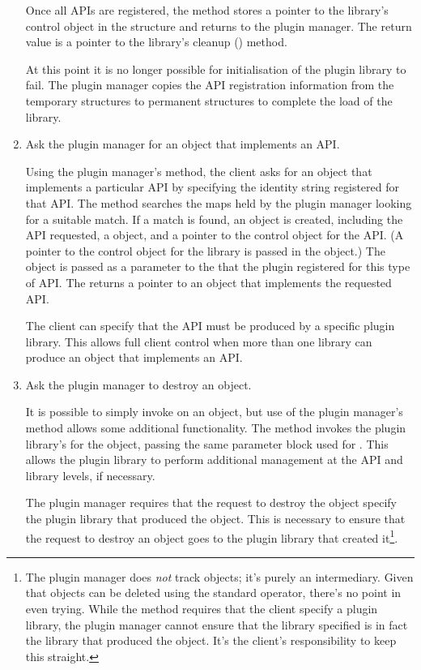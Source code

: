 \documentclass{article}
\begin{document}
\begin{enumerate}
  Once all APIs are registered, the  method stores a pointer
  to the library's control object in the  structure
  and returns to the plugin manager.
  The return value is a pointer to the library's cleanup ()
  method.

  At this point it is no longer possible for initialisation of the plugin
  library to fail.
  The plugin manager copies the API registration information from the
  temporary structures to permanent structures to complete the load of the
  library.

  \item
  Ask the plugin manager for an object that implements an API.

  Using the plugin manager's  method, the client asks for
  an object that implements a particular API by specifying the identity
  string registered for that API\@.
  The  method searches the maps held by the plugin manager
  looking for a suitable match.
  If a match is found, 
  an  object is created, including the API requested, a
   object, and a pointer to the control object for
  the API.
  (A pointer to the control object for the library is passed in the
   object.)
  The  object is passed as a parameter to the
   that the plugin registered for this type of API.
  The  returns a pointer to an object that implements the
  requested API.

  The client can specify that the API must be produced by a specific plugin
  library.
  This allows full client control when more than one library can produce an
  object that implements an API.

  \item
  Ask the plugin manager to destroy an object.

  It is possible to simply invoke  on an object, but use of the
  plugin manager's  method allows some additional
  functionality.
  The  method invokes the plugin library's
   for the object, passing the same 
  parameter block used for .
  This allows the plugin library to perform additional management at the API
  and library levels, if necessary.

  The plugin manager requires that the request to destroy the object specify
  the plugin library that produced the object.
  This is necessary to ensure that the
  request to destroy an object goes to the plugin library that created
  it\footnote{%
  The plugin manager does \textit{not} track objects; it's purely an
  intermediary.
  Given that objects can be deleted using the standard 
  operator, there's no point in even trying.
  While the  method requires that the client specify a
  plugin library, the plugin manager cannot ensure that the library specified
  is in fact the library that produced the object.
  It's the client's responsibility to keep this straight.}.


\end{enumerate}
\end{document}
